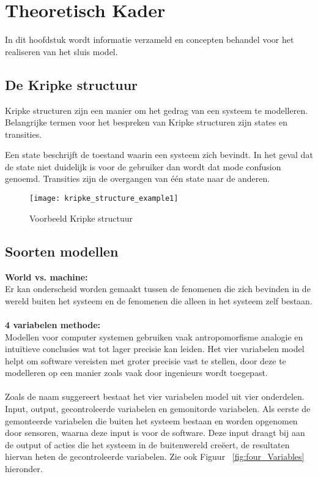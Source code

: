 \section{Theoretisch Kader}
In dit hoofdstuk wordt informatie verzameld en concepten behandel voor het realiseren van het sluis model.

\subsection{De Kripke structuur}

Kripke structuren zijn een manier om het gedrag van een systeem te modelleren. Belangrijke termen voor het bespreken van Kripke structuren zijn states en transities. \newline

Een state beschrijft de toestand waarin een systeem zich bevindt. In het geval dat de state niet duidelijk is voor de gebruiker dan wordt dat mode confusion genoemd. Transities zijn de overgangen van één state naar de anderen. 

\begin{figure}[!h]
	\centering
	\texttt{[image: kripke\_structure\_example1]}
    \caption{Voorbeeld Kripke structuur}
\end{figure}

\subsection{Soorten modellen} \label{SoortenModellen}

\textbf{World vs. machine:} 
\\
Er kan onderscheid worden gemaakt tussen de fenomenen die zich bevinden in de wereld buiten het systeem en de fenomenen die alleen in het systeem zelf bestaan. \\\\
\textbf{4 variabelen methode:}
\\
Modellen voor computer systemen gebruiken vaak antropomorfisme analogie en intuïtieve conclusies wat tot lager precisie kan leiden. Het vier variabelen model helpt om software vereisten met groter precisie vast te stellen, door deze te modelleren op een manier zoals vaak door ingenieurs wordt toegepast. \cite{parnas1995functional} 
\\\\
Zoals de naam suggereert bestaat het vier variabelen model uit vier onderdelen. Input, output, gecontroleerde variabelen en gemonitorde variabelen. Als eerste de gemonteerde variabelen die buiten het systeem bestaan en worden opgenomen door sensoren, waarna deze input is voor de software. Deze input draagt bij aan de output of acties die het systeem in de buitenwereld creëert, de resultaten hiervan heten de gecontroleerde variabelen. Zie ook Figuur ~\ref{fig:four_Variables} hieronder.


